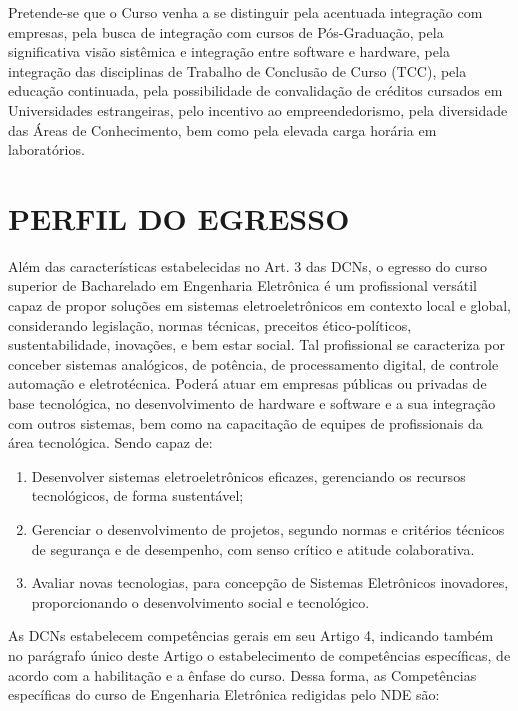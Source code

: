 Pretende-se que o Curso venha a se distinguir pela acentuada integração com empresas, pela busca de integração com cursos de Pós-Graduação, pela significativa visão sistêmica e integração entre software e hardware, pela integração das disciplinas de Trabalho de Conclusão de Curso (TCC), pela educação continuada, pela possibilidade de convalidação de créditos cursados em Universidades estrangeiras, pelo incentivo ao empreendedorismo, pela diversidade das Áreas de Conhecimento, bem como pela elevada carga horária em laboratórios.

\section{PERFIL DO EGRESSO}
\label{sec:perf}

Além das características estabelecidas no Art. 3\textordmasculine{} das DCNs, o egresso do curso superior de Bacharelado em Engenharia Eletrônica é um profissional versátil capaz de propor soluções em sistemas eletroeletrônicos em contexto local e global, considerando legislação, normas técnicas, preceitos ético-políticos, sustentabilidade, inovações, e bem estar social. Tal profissional se caracteriza por conceber sistemas analógicos, de potência, de processamento digital, de controle automação e eletrotécnica. Poderá atuar em empresas públicas ou privadas de base tecnológica, no desenvolvimento de hardware e software e a sua integração com outros sistemas, bem como na capacitação de equipes de profissionais da área tecnológica. Sendo capaz de:


\renewcommand{\labelenumi}{\roman{enumi}}
\begin{enumerate}
	\item Desenvolver sistemas eletroeletrônicos eficazes, gerenciando os recursos tecnológicos, de forma sustentável; 
	\item Gerenciar o desenvolvimento de projetos, segundo normas e critérios técnicos de segurança e de desempenho, com senso crítico e atitude colaborativa. 
	\item Avaliar novas tecnologias, para concepção de Sistemas Eletrônicos inovadores, proporcionando o desenvolvimento social e tecnológico.
\end{enumerate} 

As DCNs \cite{dcneng} estabelecem competências gerais em seu Artigo 4\textordmasculine, indicando também no parágrafo único deste Artigo o estabelecimento de competências específicas, de acordo com a habilitação e a ênfase do curso. Dessa forma, as Competências específicas do curso de Engenharia Eletrônica redigidas pelo NDE são:

